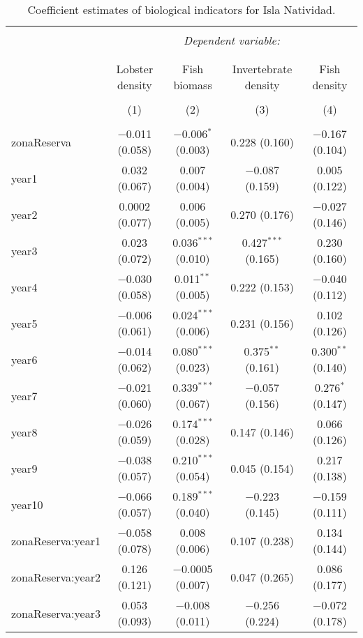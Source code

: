 
\begin{table}[!htbp] \centering 
  \caption{Coefficient estimates of biological indicators for Isla Natividad.} 
  \label{} 
\small 
\begin{tabular}{@{\extracolsep{1pt}}lcccc} 
\\[-1.8ex]\hline 
\hline \\[-1.8ex] 
 & \multicolumn{4}{c}{\textit{Dependent variable:}} \\ 
\cline{2-5} 
\\[-1.8ex] & \multicolumn{4}{c}{} \\ 
 & Lobster density & Fish biomass & Invertebrate density & Fish density \\ 
\\[-1.8ex] & (1) & (2) & (3) & (4)\\ 
\hline \\[-1.8ex] 
 zonaReserva & $-$0.011 (0.058) & $-$0.006$^{*}$ (0.003) & 0.228 (0.160) & $-$0.167 (0.104) \\ 
  year1 & 0.032 (0.067) & 0.007 (0.004) & $-$0.087 (0.159) & 0.005 (0.122) \\ 
  year2 & 0.0002 (0.077) & 0.006 (0.005) & 0.270 (0.176) & $-$0.027 (0.146) \\ 
  year3 & 0.023 (0.072) & 0.036$^{***}$ (0.010) & 0.427$^{***}$ (0.165) & 0.230 (0.160) \\ 
  year4 & $-$0.030 (0.058) & 0.011$^{**}$ (0.005) & 0.222 (0.153) & $-$0.040 (0.112) \\ 
  year5 & $-$0.006 (0.061) & 0.024$^{***}$ (0.006) & 0.231 (0.156) & 0.102 (0.126) \\ 
  year6 & $-$0.014 (0.062) & 0.080$^{***}$ (0.023) & 0.375$^{**}$ (0.161) & 0.300$^{**}$ (0.140) \\ 
  year7 & $-$0.021 (0.060) & 0.339$^{***}$ (0.067) & $-$0.057 (0.156) & 0.276$^{*}$ (0.147) \\ 
  year8 & $-$0.026 (0.059) & 0.174$^{***}$ (0.028) & 0.147 (0.146) & 0.066 (0.126) \\ 
  year9 & $-$0.038 (0.057) & 0.210$^{***}$ (0.054) & 0.045 (0.154) & 0.217 (0.138) \\ 
  year10 & $-$0.066 (0.057) & 0.189$^{***}$ (0.040) & $-$0.223 (0.145) & $-$0.159 (0.111) \\ 
  zonaReserva:year1 & $-$0.058 (0.078) & 0.008 (0.006) & 0.107 (0.238) & 0.134 (0.144) \\ 
  zonaReserva:year2 & 0.126 (0.121) & $-$0.0005 (0.007) & 0.047 (0.265) & 0.086 (0.177) \\ 
  zonaReserva:year3 & 0.053 (0.093) & $-$0.008 (0.011) & $-$0.256 (0.224) & $-$0.072 (0.178) \\ 

\end{tabular}
\end{table}
